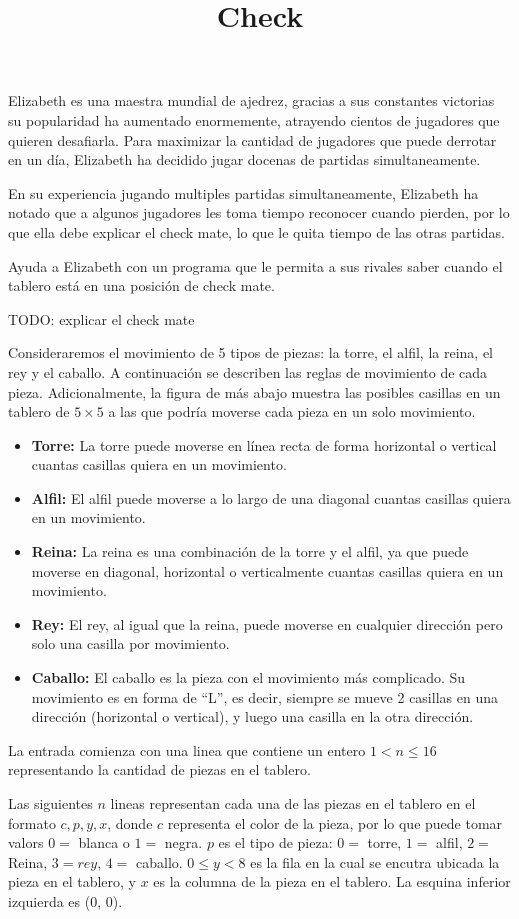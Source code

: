 \documentclass{oci}
\title{Check}
\begin{document}
\begin{problemDescription}
Elizabeth es una maestra mundial de ajedrez, gracias a sus constantes
victorias su popularidad ha aumentado enormemente, atrayendo cientos
de jugadores que quieren desafiarla. Para maximizar la cantidad de
jugadores que puede derrotar en un día, Elizabeth ha decidido jugar
docenas de partidas simultaneamente. 

En su experiencia jugando multiples partidas simultaneamente,
Elizabeth ha notado que a algunos jugadores les toma tiempo reconocer
cuando pierden, por lo que ella debe explicar el check mate, lo que le
quita tiempo de las otras partidas. 

Ayuda a Elizabeth con un programa que le permita a sus rivales saber
cuando el tablero está en una posición de check mate.

TODO: explicar el check mate

  Consideraremos el movimiento de 5 tipos de piezas: la torre, el alfil, la reina, el rey y el caballo.
  A continuación se describen las reglas de movimiento de cada pieza.
  Adicionalmente, la figura de más abajo muestra las posibles casillas en un tablero de $5\times 5$ a las que podría moverse cada pieza en un solo movimiento.
  \begin{itemize}
    \item \textbf{Torre:} La torre puede moverse en línea recta de forma horizontal o vertical cuantas casillas quiera en un movimiento.
    \item \textbf{Alfil:} El alfil puede moverse a lo largo de una diagonal cuantas casillas quiera en un movimiento.
    \item \textbf{Reina:} La reina es una combinación de la torre y el alfil, ya que puede moverse en diagonal, horizontal o verticalmente cuantas casillas quiera en un movimiento.
    \item \textbf{Rey:} El rey, al igual que la reina, puede moverse en cualquier dirección pero solo una casilla por movimiento.
    \item \textbf{Caballo:} El caballo es la pieza con el movimiento más complicado. Su movimiento es en forma de ``L'', es decir, siempre se mueve 2 casillas en una dirección (horizontal o vertical), y luego una casilla en la otra dirección.
  \end{itemize}

\end{problemDescription}

\begin{inputDescription}
    La entrada comienza con una linea que contiene un entero $ 1 < n
    \leq 16$ representando la cantidad de piezas en el tablero.

    Las siguientes $n$ lineas representan cada una de las piezas en el
    tablero en el formato $c, p, y, x$, donde $c$ representa el color
    de la pieza, por lo que puede tomar valors $0 = $ blanca o $1
    = $ negra. $p$ es el tipo de pieza: $0 =$ torre, $1 = $ alfil, $2
    = $ Reina, $3 = rey$, $4 = $ caballo. $0 \leq y < 8$ es la fila en
    la cual se encutra ubicada la pieza en el tablero, y $x$ es la
    columna de la pieza en el tablero. La esquina inferior izquierda
    es (0, 0).
\end{inputDescription}
\end{document}
